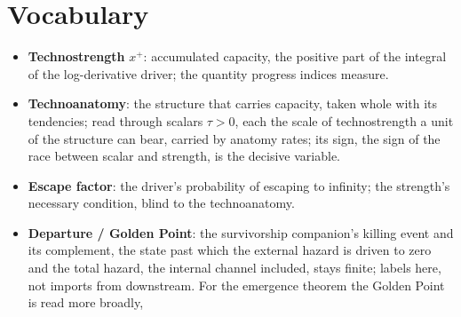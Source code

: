 \section{Vocabulary}\label{sec:vocab}
\begin{itemize}[itemsep=2pt]
\item \textbf{Technostrength} $x^+$: accumulated capacity, the positive
part of the integral of the log-derivative driver; the quantity progress
indices measure.
\item \textbf{Technoanatomy}: the structure that carries capacity, taken
whole with its tendencies; read through scalars $\tau>0$, each the scale
of technostrength a unit of the structure can bear, carried by anatomy
rates; its sign, the sign of the race between scalar and strength, is the
decisive variable.
\item \textbf{Escape factor}: the driver's probability of escaping to
infinity; the strength's necessary condition, blind to the technoanatomy.
\item \textbf{Departure / Golden Point}: the survivorship companion's
killing event and its complement, the state past which the external
hazard is driven to zero and the total hazard, the internal channel
included, stays finite; labels here, not imports from downstream. For
the emergence theorem the Golden Point is read more broadly,

\end{itemize}
